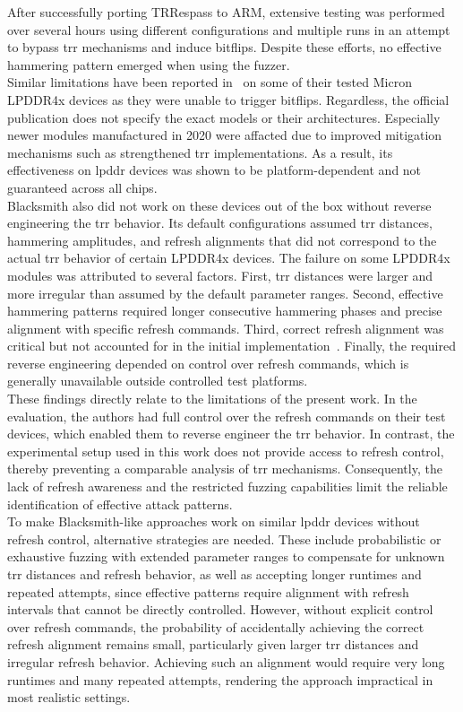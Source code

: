   After successfully porting TRRespass to ARM, extensive testing was performed 
  over several hours using different configurations and multiple runs in an attempt 
  to bypass \gls{trr} mechanisms and induce bitflips. Despite these efforts, no effective 
  hammering pattern emerged when using the fuzzer.
  \\
  Similar limitations have been reported in~\cite{paperBlacksmith} on some of their tested Micron
  LPDDR4x devices as they were unable to trigger bitflips. Regardless, the official 
  publication does not specify the exact models or their architectures. Especially 
  newer modules manufactured in 2020 were affacted due to improved mitigation 
  mechanisms such as strengthened \gls{trr} implementations. As a result, its effectiveness 
  on \gls{lpddr} devices was shown to be platform-dependent and not guaranteed across all 
  chips.
  \\
  Blacksmith also did not work on these devices out of the box without reverse 
  engineering the \gls{trr} behavior. Its default configurations assumed \gls{trr} distances, 
  hammering amplitudes, and refresh alignments that did not correspond to the actual 
  \gls{trr} behavior of certain LPDDR4x devices. The failure on some LPDDR4x modules was 
  attributed to several factors. First, \gls{trr} distances were larger and more irregular 
  than assumed by the default parameter ranges. Second, effective hammering patterns 
  required longer consecutive hammering phases and precise alignment with specific 
  refresh commands. Third, correct refresh alignment was critical but not accounted 
  for in the initial implementation~\cite{toolBlacksmith}. Finally, the required reverse engineering 
  depended on control over refresh commands, which is generally unavailable outside 
  controlled test platforms.
  \\
  These findings directly relate to the limitations of the present work. In the 
  evaluation, the authors had full control over the refresh commands on 
  their test devices, which enabled them to reverse engineer the \gls{trr} behavior. In 
  contrast, the experimental setup used in this work does not provide access to 
  refresh control, thereby preventing a comparable analysis of \gls{trr} mechanisms. 
  Consequently, the lack of refresh awareness and the restricted fuzzing capabilities 
  limit the reliable identification of effective attack patterns.
  \\
  To make Blacksmith-like approaches work on similar \gls{lpddr} devices without refresh 
  control, alternative strategies are needed. These include probabilistic or exhaustive 
  fuzzing with extended parameter ranges to compensate for unknown \gls{trr} distances and 
  refresh behavior, as well as accepting longer runtimes and repeated attempts, since 
  effective patterns require alignment with refresh intervals that cannot be directly 
  controlled. However, without explicit control over refresh commands, the probability 
  of accidentally achieving the correct refresh alignment remains small, particularly
  given larger \gls{trr} distances and irregular refresh behavior. Achieving such an alignment 
  would require very long runtimes and many repeated attempts, rendering the approach 
  impractical in most realistic settings.
